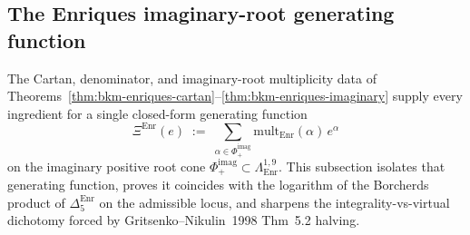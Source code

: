 \subsection{The Enriques imaginary-root generating function}
\label{subsec:bkm-enriques-generating-function}

\providecommand{\multEnr}{\mathrm{mult}_{\mathrm{Enr}}}
\providecommand{\multKthree}{\mathrm{mult}_{K3}}
\providecommand{\cKthree}{c_{K3}}
\providecommand{\EnrAdm}{\mathcal{A}_{\mathrm{Enr}}}
\providecommand{\EnrVirt}{\mathcal{V}_{\mathrm{Enr}}}
\providecommand{\CplusEnr}{C_+^{\mathrm{Enr}}}

The Cartan, denominator, and imaginary-root multiplicity data of
Theorems~\ref{thm:bkm-enriques-cartan}--\ref{thm:bkm-enriques-imaginary}
supply every ingredient for a single closed-form generating function
\[
 \Xi^{\mathrm{Enr}}(e)
 \;:=\;
 \sum_{\alpha\in\Phi_+^{\mathrm{imag}}}\multEnr(\alpha)\,e^\alpha
\]
on the imaginary positive root cone
$\Phi_+^{\mathrm{imag}}\subset\Lambda^{1,9}_{\mathrm{Enr}}$. This
subsection isolates that generating function, proves it coincides
with the logarithm of the Borcherds product of
$\Delta_5^{\mathrm{Enr}}$ on the admissible locus, and sharpens the
integrality-vs-virtual dichotomy forced by
Gritsenko--Nikulin~1998 Thm~5.2 halving.

